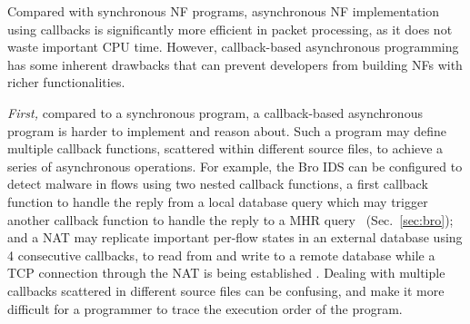 Compared with synchronous NF programs, asynchronous NF implementation using callbacks is significantly more efficient in packet processing, as it does not waste important CPU time. However, callback-based asynchronous programming has some inherent drawbacks that can prevent developers from building NFs with richer functionalities.

\textit{First,} compared to a synchronous program, a callback-based asynchronous program is harder to implement and reason about. %
Such a program may define multiple callback functions, scattered within different source files, to achieve a series of asynchronous operations. For example, the Bro IDS can be configured to detect malware in flows using two nested callback functions, a first callback function to handle the reply from a local database query which may trigger another callback function to handle the reply to a MHR query~ (Sec.~\ref{sec:bro}); and a NAT may replicate important per-flow states in an external database using 4 consecutive callbacks, to read from and write to a remote database while a TCP connection through the NAT is being established \cite{201545}. Dealing with multiple callbacks scattered in different source files can be confusing, and make it more difficult for a programmer to trace the execution order of the program. %



